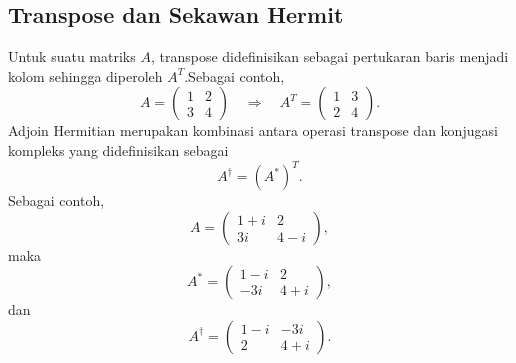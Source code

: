 \subsection{Transpose dan Sekawan Hermit}
Untuk suatu matriks $A$, transpose didefinisikan sebagai pertukaran baris menjadi kolom sehingga diperoleh $A^T$.Sebagai contoh,
\begin{equation}
    A=
    \begin{pmatrix}
        1 & 2 \\
        3 & 4
    \end{pmatrix}
    \quad \Rightarrow \quad
    A^T=
    \begin{pmatrix}
        1 & 3 \\
        2 & 4
    \end{pmatrix}.
\end{equation}
Adjoin Hermitian merupakan kombinasi antara operasi transpose dan konjugasi kompleks yang didefinisikan sebagai
\begin{equation}
\label{eq:hermitian_adjoint}
    A^\dagger = (A^*)^T.
\end{equation}
Sebagai contoh,
\begin{equation}
    A=
    \begin{pmatrix}
        1+i & 2 \\
        3i & 4-i
    \end{pmatrix},
\end{equation}
maka
\begin{equation}
    A^*
    =
    \begin{pmatrix}
        1-i & 2 \\
        -3i & 4+i
    \end{pmatrix},
\end{equation}
dan
\begin{equation}
    A^\dagger
    =
    \begin{pmatrix}
        1-i & -3i \\
        2 & 4+i
    \end{pmatrix}.
\end{equation}

